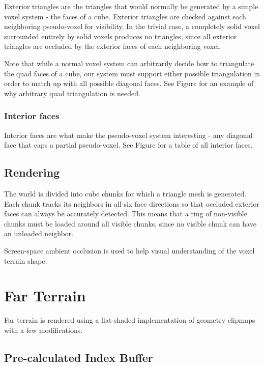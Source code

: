 Exterior triangles are the triangles that would normally be generated by a simple voxel system - the faces of a cube.
Exterior triangles are checked against each neighboring pseudo-voxel for visibility.
In the trivial case, a completely solid voxel surrounded entirely by solid voxels produces no triangles, since all exterior triangles are occluded by the exterior faces of each neighboring voxel.

Note that while a normal voxel system can arbitrarily decide how to triangulate the quad faces of a cube, our system must support either possible triangulation in order to match up with all possible diagonal faces.
See Figure  for an example of why arbitrary quad triangulation is needed.

\subsubsection{Interior faces}

Interior faces are what make the pseudo-voxel system interesting - any diagonal face that caps a partial pseudo-voxel.
See Figure  for a table of all interior faces.

\subsection{Rendering}

The world is divided into cube chunks for which a triangle mesh is generated.
Each chunk tracks its neighbors in all six face directions so that occluded exterior faces can always be accurately detected.
This means that a ring of non-visible chunks must be loaded around all visible chunks, since no visible chunk can have an unloaded neighbor.

Screen-space ambient occlusion is used to help visual understanding of the voxel terrain shape.


\section{Far Terrain} \label{clipterrain} %

Far terrain is rendered using a flat-shaded implementation of geometry clipmaps with a few modifications.

\subsection{Pre-calculated Index Buffer}


